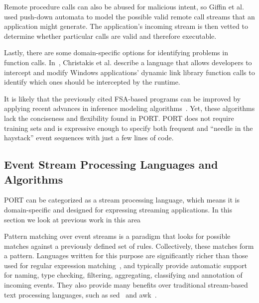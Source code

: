 Remote procedure calls can also be abused for malicious
intent,
so Giffin et al. ~\cite{DBLP:conf/uss/GiffinJM02} used
push-down automata to model the possible valid
remote call streams that an application might generate.
The application's incoming stream 
is then vetted
to determine whether particular calls are valid and therefore executable.

Lastly, there are some domain-specific options for
identifying problems
in function calls.
In~\cite{DBLP:conf/icse/ChristakisEG017}, Christakis et al. describe a language that allows developers to intercept and modify
Windows applications’ dynamic link library function calls to identify which ones should be
intercepted by the runtime.

%
It is likely that the previously cited FSA-based programs can be improved by applying recent advances in inference modeling algorithms~\cite{MarianiPS17,WalkinshawTD13,EmamM18,BeschastnikhBEK14}. Yet, these algorithms lack the conciseness and flexibility found in PORT. PORT does not require training sets and is expressive enough to specify both frequent and  “needle in the haystack” event sequences with just a few lines of code.


\subsection{Event Stream Processing Languages and Algorithms}
PORT can be categorized as a stream processing language,
which means it is domain-specific and
designed for expressing streaming applications.
In this section we look at previous work in this area

Pattern matching
over event streams is a paradigm
that looks for
possible matches against a previously defined set of rules. Collectively, these matches form a pattern.
Languages written for this purpose are significantly richer than those used for regular expression
matching~\cite{DBLP:conf/sigmod/AgrawalDGI08},
and typically provide automatic
support for naming, type checking, filtering, aggregating, classifying and
annotation of incoming events. They also  provide many benefits over traditional
stream-based text processing languages, such as sed~\cite{Mcmahon1979sed} and
awk~\cite{DBLP:journals/spe/AhoKW79}.

